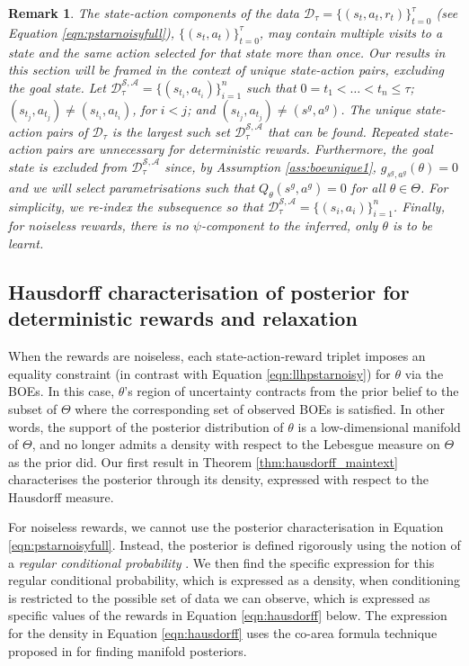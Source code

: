 \documentclass{amsart}
\newtheorem{remark}{Remark}
\begin{document}
\begin{remark}
The state-action components of the data $\mathcal{D}_{\tau} =\{(s_t,a_t,r_t)\}_{t=0}^{\tau}$ (see  Equation \ref{eqn:pstarnoisyfull}), $\{(s_t,a_t)\}_{t=0}^{\tau}$, may contain multiple visits to a state and the same action selected for that state more than once. Our results in this section will be framed in the context of unique state-action pairs, excluding the goal state. Let
$\mathcal{D}^{\mathcal{S},\mathcal{A}}_{\tau} =\{(s_{t_i},a_{t_i})\}_{i=1}^n$ such that $0=t_1<\ldots<t_n\leq\tau$;  
$(s_{t_j},a_{t_j})\neq (s_{t_i},a_{t_i})$, for $i<j$; and $(s_{t_j},a_{t_j}) \neq (s^g,a^g)$. The unique state-action pairs of $\mathcal{D}_{\tau}$ is the largest such set $\mathcal{D}^{\mathcal{S},\mathcal{A}}_{\tau}$ that can be found.
Repeated state-action pairs are unnecessary for deterministic rewards. Furthermore, the goal state is excluded from $\mathcal{D}^{\mathcal{S},\mathcal{A}}_{\tau}$ since, by Assumption \ref{ass:boeunique1}, $g_{s^g,a^g}(\theta)=0$ and we will select parametrisations such that $Q_\theta(s^g,a^g)=0$ for all $\theta \in \Theta$. For simplicity, we re-index the subsequence so that
$\mathcal{D}^{\mathcal{S},\mathcal{A}}_{\tau} =\{(s_{i},a_{i})\}_{i=1}^n$.
Finally, for noiseless rewards, there is no $\psi$-component to the inferred, only $\theta$ is to be learnt.

\label{rem:dataset}
\end{remark}



\subsection{Hausdorff characterisation of posterior for deterministic rewards and relaxation} \label{sec:hausdorff}
When the rewards are noiseless, each state-action-reward triplet imposes an equality constraint (in contrast with Equation \ref{eqn:llhpstarnoisy}) for $\theta$ via the BOEs. In this case, $\theta$'s region of uncertainty contracts from the prior belief to the subset of $\Theta$ where the corresponding set of observed BOEs is satisfied. In other words, the support of the posterior distribution of $\theta$ is a low-dimensional manifold of $\Theta$, and no longer admits a density with respect to the Lebesgue measure on  $\Theta$ as the prior did. Our first result in Theorem \ref{thm:hausdorff_maintext} characterises the posterior through its density, expressed with respect to the Hausdorff measure.

 For noiseless rewards, we cannot use the posterior characterisation in Equation \ref{eqn:pstarnoisyfull}. Instead, the posterior is defined rigorously using the notion of a {\it regular conditional probability }\citep{rcp_def_parthasarathy}. We then find the specific expression for this regular conditional probability, which is expressed as a density, when conditioning is restricted to the possible set of data we can observe, which is expressed as specific values of the rewards in Equation \ref{eqn:hausdorff} below. The expression for the density in Equation \ref{eqn:hausdorff} uses the co-area formula technique proposed in \citet{coarea-diaconis} for finding manifold posteriors. 
\end{document}
